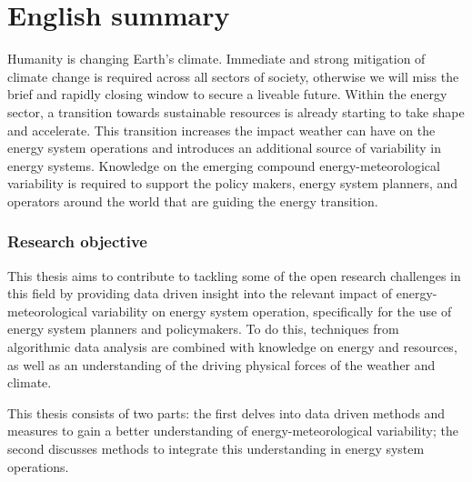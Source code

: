 
\chapter{English summary}


Humanity is changing Earth's climate.
Immediate and strong mitigation of climate change is required across all sectors of society, otherwise we will miss the brief and rapidly closing window to secure a liveable future.
Within the energy sector, a transition towards sustainable resources is already starting to take shape and accelerate.
This transition increases the impact weather can have on the energy system operations and introduces an additional source of variability in energy systems.
Knowledge on the emerging compound energy-meteorological variability is required to support the policy makers, energy system planners, and operators around the world that are guiding the energy transition.



\subsection*{Research objective}
This thesis aims to contribute to tackling some of the open research challenges in this field by providing data driven insight into the relevant impact of energy-meteorological variability on energy system operation, specifically for the use of energy system planners and policymakers.
To do this, techniques from algorithmic data analysis are combined with knowledge on energy and resources, as well as an understanding of the driving physical forces of the weather and climate.

This thesis consists of two parts: the first delves into data driven methods and measures to gain a better understanding of energy-meteorological variability; the second discusses methods to integrate this understanding in energy system operations.


